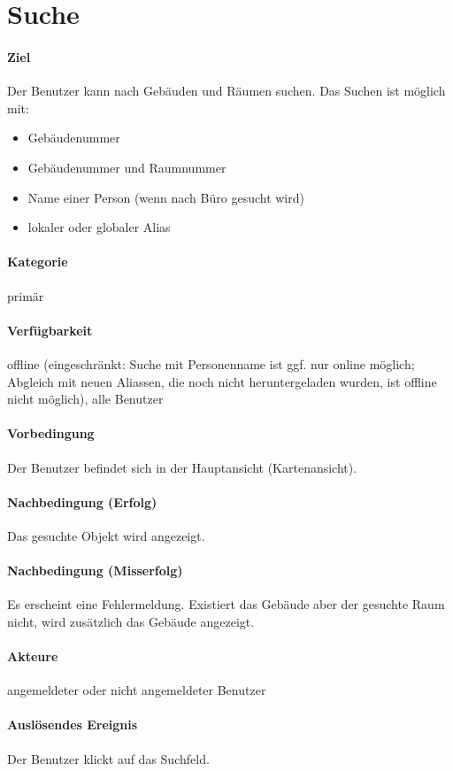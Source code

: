 \section{Suche}
\paragraph{Ziel}
Der Benutzer kann nach Gebäuden und Räumen suchen. 
Das Suchen ist möglich mit:
\begin{itemize}
    \item Gebäudenummer
    \item Gebäudenummer und Raumnummer
    \item Name einer Person (wenn nach Büro gesucht wird)
    \item lokaler oder globaler Alias
\end{itemize}

\paragraph{Kategorie}
primär
\paragraph{Verfügbarkeit}
offline (eingeschränkt: Suche mit Personenname ist ggf. nur online möglich; Abgleich mit neuen Aliassen, die noch nicht heruntergeladen wurden, ist offline nicht möglich), alle Benutzer
\paragraph{Vorbedingung}
Der Benutzer befindet sich in der Hauptansicht (Kartenansicht).
\paragraph{Nachbedingung (Erfolg)}
Das gesuchte Objekt wird angezeigt.
\paragraph{Nachbedingung (Misserfolg)}
Es erscheint eine Fehlermeldung. Existiert das Gebäude aber der gesuchte Raum nicht, wird zusätzlich das Gebäude angezeigt.
\paragraph{Akteure}
angemeldeter oder nicht angemeldeter Benutzer
\paragraph{Auslösendes Ereignis}
Der Benutzer klickt auf das Suchfeld.
